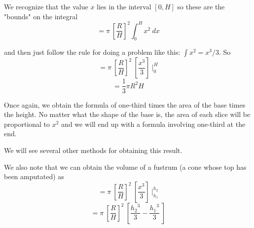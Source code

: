 \documentclass[11pt, oneside]{article}
\begin{document}
We recognize that the value $x$ lies in the interval $[0,H]$ so these are the "bounds" on the integral
\[ = \pi \ [ \frac{R}{H} ]^2 \int_0^H x^2 \ dx \]

and then just follow the rule for doing a problem like this:  $\int x^2 = x^3/3$.  So
\[ = \pi \ [ \frac{R}{H} ]^2 \ [  \frac{x^3}{3} ] \ \bigg |_0^H \]
\[ = \frac{1}{3} \pi R^2 H \]

Once again, we obtain the formula of one-third times the area of the base times the height.  No matter what the shape of the base is, the area of each slice will be proportional to $x^2$ and we will end up with a formula involving one-third at the end.

We will see several other methods for obtaining this result.

We also note that we can obtain the volume of a fustrum (a cone whose top has been amputated) as
\[ = \pi \ [ \frac{R}{H} ]^2 \ [  \frac{x^3}{3} ] \ \bigg |_{h_1}^{h_2} \]
\[ = \pi \ [ \frac{R}{H} ]^2 \ [  \frac{{h_2}^3}{3} -  \frac{{h_1}^3}{3}  \ ] \]
\end{document}
